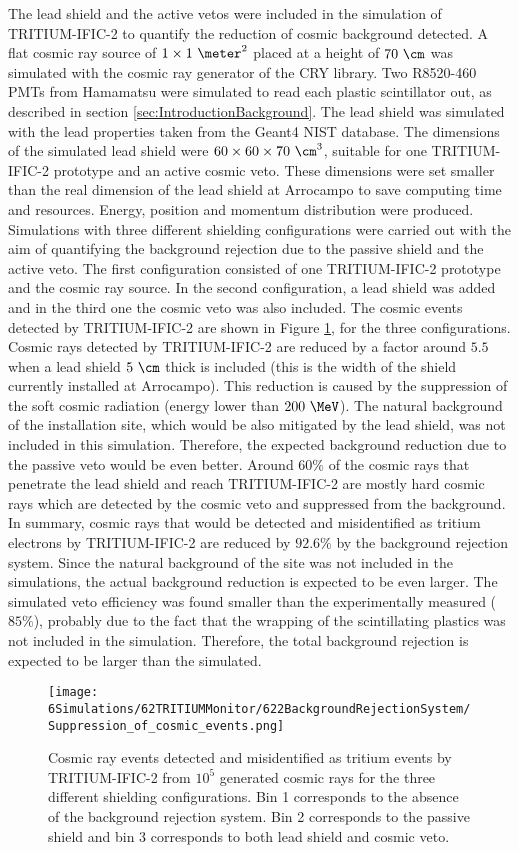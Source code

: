 The lead shield and the active vetos were included in the simulation of TRITIUM-IFIC-2 to quantify the reduction of cosmic background detected. A flat cosmic ray source of $1 \times 1~\meter^2$ placed at a height of $70~\cm$ was simulated with the cosmic ray generator of the CRY library. Two R8520-460 PMTs from Hamamatsu were simulated to read each plastic scintillator out, as described in section \ref{sec:IntroductionBackground}. The lead shield was simulated with the lead properties taken from the Geant4 NIST database. The dimensions of the simulated lead shield were $60 \times 60 \times 70~\cm^3$, suitable for one TRITIUM-IFIC-2 prototype and an active cosmic veto. These dimensions were set smaller than the real dimension of the lead shield at Arrocampo to save computing time and resources. Energy, position and momentum distribution were produced. Simulations with three different shielding configurations were carried out with the aim of quantifying the background rejection due to the passive shield and the active veto. The first configuration consisted of one TRITIUM-IFIC-2 prototype and the cosmic ray source. In the second configuration, a lead shield was added and in the third one the cosmic veto was also included. The cosmic events detected by TRITIUM-IFIC-2 are shown in Figure \ref{fig:CosmicEventsSuppressionSimulated}, for the three configurations. Cosmic rays detected by TRITIUM-IFIC-2 are reduced by a factor around $5.5$ when a lead shield $5~\cm$ thick is included (this is the width of the shield currently installed at Arrocampo). This reduction is caused by the suppression of the soft cosmic radiation (energy lower than $200~\MeV$). The natural background of the installation site, which would be also mitigated by the lead shield, was not included in this simulation. Therefore, the expected background reduction due to the passive veto would be even better. Around $60\%$ of the cosmic rays that penetrate the lead shield and reach TRITIUM-IFIC-2 are mostly hard cosmic rays which are detected by the cosmic veto and suppressed from the background. In summary, cosmic rays that would be detected and misidentified as tritium electrons by TRITIUM-IFIC-2 are reduced by $92.6\%$ by the background rejection system. Since the natural background of the site was not included in the simulations, the actual background reduction is expected to be even larger. The simulated veto efficiency was found smaller than the experimentally measured ($85\%$), probably due to the fact that the wrapping of the scintillating plastics was not included in the simulation. Therefore, the total background rejection is expected to be larger than the simulated.

\begin{figure}[h]
\texttt{[image: 6Simulations/62TRITIUMMonitor/622BackgroundRejectionSystem/Suppression\_of\_cosmic\_events.png]}
\centering
\caption{Cosmic ray events detected and misidentified as tritium events by TRITIUM-IFIC-2 from $10^5$ generated cosmic rays for the three different shielding configurations. Bin 1 corresponds to the absence of the background rejection system. Bin 2 corresponds to the passive shield and bin 3 corresponds to both lead shield and cosmic veto.  \label{fig:CosmicEventsSuppressionSimulated}}
\end{figure}